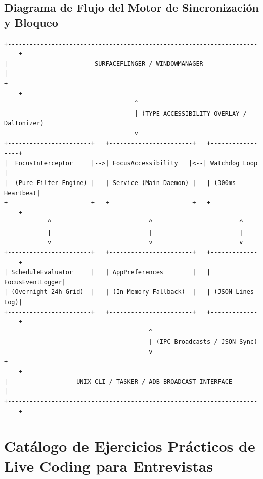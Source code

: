 \documentclass[11pt,a4paper,oneside]{report}
\begin{document}
\section{Diagrama de Flujo del Motor de Sincronización y Bloqueo}
\begin{center}
\begin{verbatim}
+-------------------------------------------------------------------------+
|                        SURFACEFLINGER / WINDOWMANAGER                   |
+-------------------------------------------------------------------------+
                                    ^
                                    | (TYPE_ACCESSIBILITY_OVERLAY / Daltonizer)
                                    v
+-----------------------+   +-----------------------+   +-----------------+
|  FocusInterceptor     |-->| FocusAccessibility   |<--| Watchdog Loop   |
|  (Pure Filter Engine) |   | Service (Main Daemon) |   | (300ms Heartbeat|
+-----------------------+   +-----------------------+   +-----------------+
            ^                           ^                        ^
            |                           |                        |
            v                           v                        v
+-----------------------+   +-----------------------+   +-----------------+
| ScheduleEvaluator     |   | AppPreferences        |   | FocusEventLogger|
| (Overnight 24h Grid)  |   | (In-Memory Fallback)  |   | (JSON Lines Log)|
+-----------------------+   +-----------------------+   +-----------------+
                                        ^
                                        | (IPC Broadcasts / JSON Sync)
                                        v
+-------------------------------------------------------------------------+
|                   UNIX CLI / TASKER / ADB BROADCAST INTERFACE           |
+-------------------------------------------------------------------------+
\end{verbatim}
\end{center}

\newpage

\chapter[Ejercicios de Live Coding]{Catálogo de Ejercicios Prácticos de Live Coding para Entrevistas}
\end{document}
